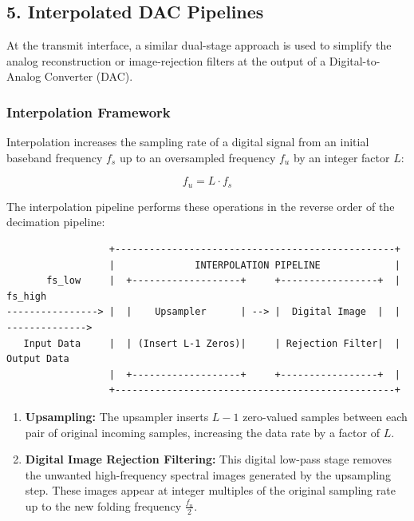 \documentclass[
]{article}
\providecommand{\tightlist}{%
  \setlength{\itemsep}{0pt}\setlength{\parskip}{0pt}}
\begin{document}
\subsection{5. Interpolated DAC
Pipelines}\label{interpolated-dac-pipelines}

At the transmit interface, a similar dual-stage approach is used to
simplify the analog reconstruction or image-rejection filters at the
output of a Digital-to-Analog Converter (DAC).

\subsubsection{Interpolation Framework}\label{interpolation-framework}

Interpolation increases the sampling rate of a digital signal from an
initial baseband frequency \(f_s\) up to an oversampled frequency
\(f_u\) by an integer factor \(L\):

\[f_u = L \cdot f_s\]

The interpolation pipeline performs these operations in the reverse
order of the decimation pipeline:

\begin{verbatim}
                  +-------------------------------------------------+
                  |              INTERPOLATION PIPELINE             |
       fs_low     |  +-------------------+     +-----------------+  |     fs_high
----------------> |  |    Upsampler      | --> |  Digital Image  |  | -------------->
   Input Data     |  | (Insert L-1 Zeros)|     | Rejection Filter|  |   Output Data
                  |  +-------------------+     +-----------------+  |
                  +-------------------------------------------------+
\end{verbatim}

\begin{enumerate}
\def\labelenumi{\arabic{enumi}.}
\tightlist
\item
  \textbf{Upsampling:} The upsampler inserts \(L-1\) zero-valued samples
  between each pair of original incoming samples, increasing the data
  rate by a factor of \(L\).
\item
  \textbf{Digital Image Rejection Filtering:} This digital low-pass
  stage removes the unwanted high-frequency spectral images generated by
  the upsampling step. These images appear at integer multiples of the
  original sampling rate up to the new folding frequency
  \(\frac{f_u}{2}\).
\end{enumerate}
\end{document}
